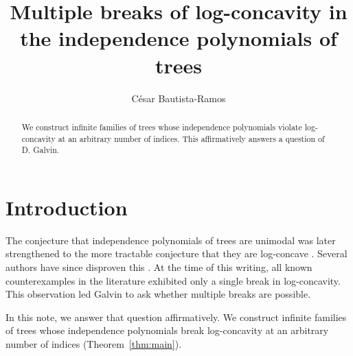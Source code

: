 \documentclass[reqno]{amsart}
\begin{document}
\title[Breaks of log-concavity in the independence polynomials of trees]{Multiple breaks of log-concavity in the independence polynomials of trees}


\author{C\'esar Bautista-Ramos} 

\address{Facultad de Ciencias de la Computaci\'on, Benem\'erita Universidad Aut\'onoma de Pue\-bla, 14 sur y Avenida San Claudio, CC03-304, Ciudad Universitaria, Puebla, 72570, Puebla, Mexico}


\begin{abstract}
We construct infinite families of trees whose independence polynomials violate log-concavity at an arbitrary number of indices. This affirmatively answers a question of D. Galvin.
\end{abstract}






\maketitle





\section{Introduction}
\label{intro}
The conjecture that independence polynomials of trees are unimodal \cite{Alavi} was later strengthened to the more tractable conjecture that they are log-concave \cite{Levit}. Several authors have since disproven this \cite{Kadrawi, Kadrawi2,Galvin,Ramos}. At the time of this writing, all known counterexamples in the literature exhibited only a single break in log-concavity. This observation led Galvin \cite{Galvin} to ask whether multiple breaks are possible.

In this note, we answer that question affirmatively. We construct infinite families of trees whose independence polynomials break log-concavity at an arbitrary number of indices (Theorem~\ref{thm:main}).
\end{document}
